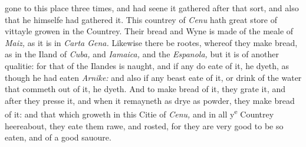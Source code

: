 \documentclass[11pt,twoside]{article}\makeatletter
\begin{document}
 gone to this place three times, and had seene it gathered after that sort, and also that he himselfe had gathered it. This coun­trey of {\itshape Cenu} hath great store of vittayle growen in the Coun­trey. Their bread and Wyne is made of the meale of {\itshape Maiz,} as it is in {\itshape Carta Gena.} Likewise there be rootes, whereof they make bread, as in the Iland of {\itshape Cuba,} and {\itshape Iamaica,} and the {\itshape Es­panola,} but it is of another qualitie: for that of the Ilandes is naught, and if any do eate of it, he dyeth, as though he had ea­ten {\itshape Arnike:} and also if any beast eate of it, or drink of the wa­ter that commeth out of it, he dyeth. And to make bread of it, they grate it, and after they presse it, and when it remayneth as drye as powder, they make bread of it: and that which gro­weth in this Citie of {\itshape Cenu,} and in all y\textsuperscript{e} Countrey heereabout, they eate them rawe, and rosted, for they are very good to be so eaten, and of a good sauoure.
\end{document}
